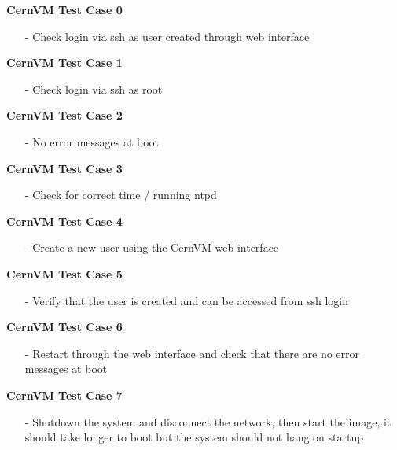 \begin{description}
\item {\bf	 CernVM Test Case 0}
		\begin{itemize}
		\item[-] 	Check login via ssh as user created through web interface
		\end{itemize}

\item {\bf	 CernVM Test Case 1}
		\begin{itemize}
		\item[-] 	Check login via ssh as root
		\end{itemize}

\item {\bf	 CernVM Test Case 2}
		\begin{itemize}
		\item[-] 	No error messages at boot
		\end{itemize}

\item {\bf	 CernVM Test Case 3}
		\begin{itemize}
		\item[-] 	Check for correct time / running ntpd
		\end{itemize}

\item {\bf	 CernVM Test Case 4}
		\begin{itemize}
		\item[-] 	Create a new user using the CernVM web interface
		\end{itemize}

\item {\bf	 CernVM Test Case 5}
		\begin{itemize}
		\item[-] 	 Verify that the user is created and can be accessed from ssh login
		\end{itemize}

\item {\bf	 CernVM Test Case 6}
		\begin{itemize}
		\item[-] 	Restart through the web interface and check that there are no error
						messages at boot
		\end{itemize}

\item {\bf	 CernVM Test Case 7}
		\begin{itemize}
		\item[-] 	Shutdown the system and disconnect the network, then start the image, 
						it should take longer to boot but the system should not hang on startup
		\end{itemize}


\end{description}
